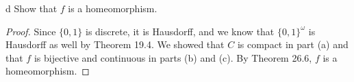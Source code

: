 \documentclass[11pt]{article}
\begin{document}
\begin{p}{d}
  Show that $f$ is a homeomorphism.
\end{p}

\begin{proof}
  Since $\{0, 1\}$ is discrete, it is Hausdorff, and we know that $\{0,
  1\}^\omega$ is Hausdorff as well by Theorem 19.4. We showed that $C$ is
  compact in part (a) and that $f$ is bijective and continuous in parts (b) and
  (c). By Theorem 26.6, $f$ is a homeomorphism.
\end{proof}
\end{document}
